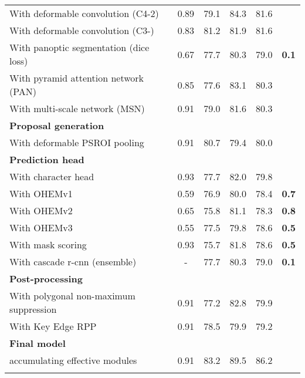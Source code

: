 \begin{table*}
\begin{tabular}{lccccc}
  \hspace{5mm} With deformable convolution (C4-2) & 0.89 & 79.1 & 84.3 & 81.6 & \bf \color{red}{ 2.5} \\
  \hspace{5mm} With deformable convolution (C3-) & 0.83 & 81.2 & 81.9 & 81.6 & \bf \color{red}{ 2.5} \\
  \hspace{5mm} With panoptic segmentation (dice loss) & 0.67 & 77.7 & 80.3 & 79.0 &  \bf \textcolor[RGB]{0,160,0}{ 0.1} \\
  \hspace{5mm} With pyramid attention network (PAN) & 0.85 & 77.6 & 83.1 & 80.3 & \bf \color{red}{ 1.2} \\
  \hspace{5mm} With multi-scale network (MSN) & 0.91 & 79.0 & 81.6 & 80.3 & \bf \color{red}{ 1.2} \\
  \noalign{\smallskip}\hline
  {\bf Proposal generation} \\
  \hspace{5mm} With deformable PSROI pooling & 0.91 & 80.7 & 79.4 & 80.0 &  \bf \color{red}{ 0.9} \\
  \noalign{\smallskip}\hline
  {\bf Prediction head} \\
  \hspace{5mm} With character head & 0.93 & 77.7 & 82.0 & 79.8 &  \bf \color{red}{ 0.7} \\
  \hspace{5mm} With OHEMv1 & 0.59 & 76.9 & 80.0 & 78.4 &  \bf \textcolor[RGB]{0,160,0}{ 0.7} \\
  \hspace{5mm} With OHEMv2 & 0.65 & 75.8 & 81.1 & 78.3 &  \bf \textcolor[RGB]{0,160,0}{ 0.8} \\
  \hspace{5mm} With OHEMv3 & 0.55 & 77.5 & 79.8 & 78.6 &  \bf \textcolor[RGB]{0,160,0}{ 0.5} \\
  \hspace{5mm} With mask scoring & 0.93 & 75.7 & 81.8 & 78.6 &  \bf \textcolor[RGB]{0,160,0}{ 0.5} \\
\hspace{5mm} With cascade r-cnn (ensemble) & - & 77.7 & 80.3 & 79.0 &  \bf \textcolor[RGB]{0,160,0}{ 0.1} \\
  \noalign{\smallskip}\hline
  {\bf Post-processing} \\
  \hspace{5mm} With polygonal non-maximum suppression & 0.91 & 77.2 & 82.8 & 79.9 & \bf \color{red}{ 0.8} \\
  \hspace{5mm} With Key Edge RPP & 0.91 & 78.5 & 79.9 & 79.2 & \bf \color{red}{ 0.1} \\
\noalign{\smallskip}\hline
  {\bf Final model} \\
  \hspace{5mm} accumulating effective modules & 0.91 & 83.2 & 89.5 & 86.2 &  \bf \color{red}{ 7.1} \\
  \noalign{\smallskip}\hline
  \end{tabular}
\end{table*}

